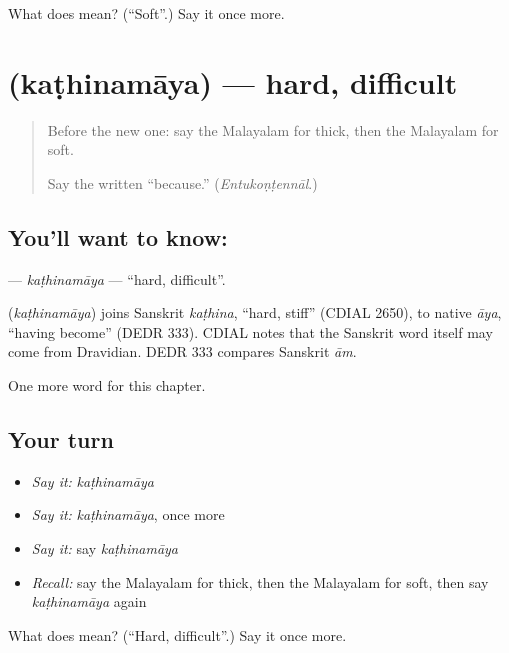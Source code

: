 \begin{tcolorbox}[breakable,colback=teal!4,colframe=teal!35!black,title={Before you move on}]
What does  mean? (\textquotedblleft{}Soft\textquotedblright{}.) Say it once more.
\end{tcolorbox}
\section[\texorpdfstring{\ml{കഠിനമായ} (kaṭhinamāya)}{കഠിനമായ (kaṭhinamāya)}]{ (kaṭhinamāya) — hard, difficult}

\label{lesson:ML-C166-kathinamaya}



\begin{quote}
Before the new one: say the Malayalam for thick, then the Malayalam for soft.

Say the written \textquotedblleft{}because.\textquotedblright{} (\emph{Entukoṇṭennāl}.)
\end{quote}

\subsection*{You'll want to know: }
\textbf{} — \emph{kaṭhinamāya} — \textquotedblleft{}hard, difficult\textquotedblright{}.

\begin{cousinweb}
\textbf{} (\emph{kaṭhinamāya}) joins Sanskrit \emph{kaṭhina}, \textquotedblleft{}hard, stiff\textquotedblright{} (CDIAL 2650), to native \emph{āya}, \textquotedblleft{}having become\textquotedblright{} (DEDR 333). CDIAL notes that the Sanskrit word itself may come from Dravidian. DEDR 333 compares Sanskrit \emph{ām}.
\end{cousinweb}

\begin{grammarlens}[title={What you've built}]
One more word for this chapter.
\end{grammarlens}

\subsection*{Your turn}
\begin{itemize}
\raggedright
  \item \emph{Say it:} \emph{kaṭhinamāya}
  \item \emph{Say it:} \emph{kaṭhinamāya}, once more
  \item \emph{Say it:} say \emph{kaṭhinamāya}
  \item \emph{Recall:} say the Malayalam for thick, then the Malayalam for soft, then say \emph{kaṭhinamāya} again
\end{itemize}

\begin{tcolorbox}[breakable,colback=teal!4,colframe=teal!35!black,title={Before you move on}]
What does  mean? (\textquotedblleft{}Hard, difficult\textquotedblright{}.) Say it once more.
\end{tcolorbox}

